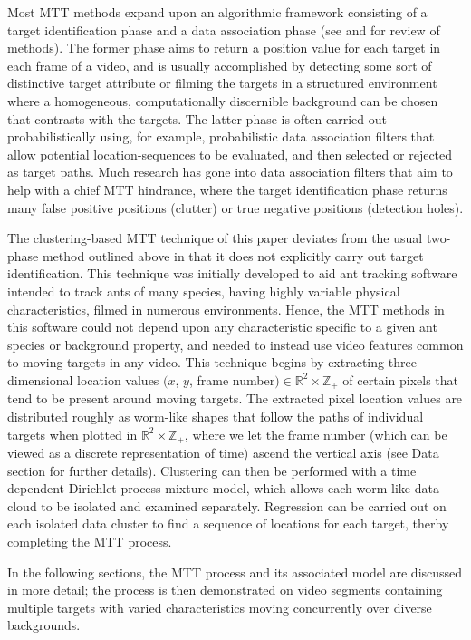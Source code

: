 \documentclass{article}
\begin{document}
Most MTT methods expand upon an algorithmic framework consisting of a target identification phase and a data association phase (see \cite{1521260} and \cite{probmethods} for review of methods). The former phase aims to return a position value for each target in each frame of a video, and is usually accomplished by detecting some sort of distinctive target attribute or filming the targets in a structured environment where a homogeneous, computationally discernible background can be chosen that contrasts with the targets. The latter phase is often carried out probabilistically using, for example, probabilistic data association filters that allow potential location-sequences to be evaluated, and then selected or rejected as target paths. Much research has gone into data association filters that aim to help with a chief MTT hindrance, where the target identification phase returns many false positive positions (clutter) or true negative positions (detection holes).

The clustering-based MTT technique of this paper deviates from the usual two-phase method outlined above in that it does not explicitly carry out target identification. This technique was initially developed to aid ant tracking software intended to track ants of many species, having highly variable physical characteristics, filmed in numerous environments. Hence, the MTT methods in this software could not depend upon any characteristic specific to a given ant species or background property, and needed to instead use video features common to moving targets in any video. This technique begins by extracting three-dimensional location values $(x$, $y$, frame number$) \in \mathbb{R}^{2} \times \mathbb{Z}_{+}$ of certain pixels that tend to be present around moving targets. The extracted pixel location values are distributed roughly as worm-like shapes that follow the paths of individual targets when plotted in $\mathbb{R}^{2} \times \mathbb{Z}_{+}$, where we let the frame number (which can be viewed as a discrete representation of time) ascend the vertical axis (see Data section for further details). Clustering can then be performed with a time dependent Dirichlet process mixture model, which allows each worm-like data cloud to be isolated and examined separately. Regression can be carried out on each isolated data cluster to find a sequence of locations for each target, therby completing the MTT process.

In the following sections, the MTT process and its associated model are discussed in more detail; the process is then demonstrated on video segments containing multiple targets with varied characteristics moving concurrently over diverse backgrounds. 
\end{document}
